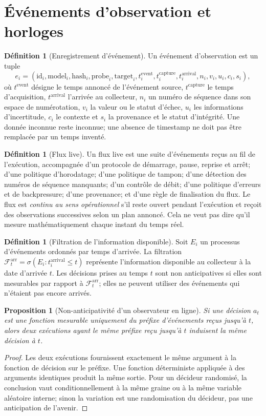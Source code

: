\documentclass[11pt,oneside]{book}
\newtheorem{proposition}[theoreme]{Proposition}
\theoremstyle{definition}
\newtheorem{definition}[theoreme]{Définition}
\theoremstyle{remark}
\newcommand{\Fcal}{\mathcal F}
\newcommand{\1}{\mathbf 1}
\begin{document}
\section{Événements d'observation et horloges}
\begin{definition}[Enregistrement d'événement]
Un événement d'observation est un tuple
\[
e_i=(\mathrm{id}_i,\mathrm{model}_i,\mathrm{hash}_i,\mathrm{probe}_i,\mathrm{target}_i,
 t_i^{\mathrm{event}},t_i^{\mathrm{capture}},t_i^{\mathrm{arrival}},n_i,v_i,u_i,c_i,s_i),
\]
où $t^{\mathrm{event}}$ désigne le temps annoncé de l'événement source, $t^{\mathrm{capture}}$ le temps d'acquisition, $t^{\mathrm{arrival}}$ l'arrivée au collecteur, $n_i$ un numéro de séquence dans son espace de numérotation, $v_i$ la valeur ou le statut d'échec, $u_i$ les informations d'incertitude, $c_i$ le contexte et $s_i$ la provenance et le statut d'intégrité. Une donnée inconnue reste inconnue; une absence de timestamp ne doit pas être remplacée par un temps inventé.
\end{definition}

\begin{definition}[Flux live]
Un flux live est une suite d'événements reçus au fil de l'exécution, accompagnée d'un protocole de démarrage, pause, reprise et arrêt; d'une politique d'horodatage; d'une politique de tampon; d'une détection des numéros de séquence manquants; d'un contrôle de débit; d'une politique d'erreurs et de backpressure; d'une provenance; et d'une règle de finalisation du flux. Le flux est \emph{continu au sens opérationnel} s'il reste ouvert pendant l'exécution et reçoit des observations successives selon un plan annoncé. Cela ne veut pas dire qu'il mesure mathématiquement chaque instant du temps réel.
\end{definition}

\begin{definition}[Filtration de l'information disponible]
Soit $E_i$ un processus d'événements ordonnés par temps d'arrivée. La filtration $\Fcal_t^{\mathrm{arr}}=\sigma(E_i:t_i^{\mathrm{arrival}}\leq t)$ représente l'information disponible au collecteur à la date d'arrivée $t$. Les décisions prises au temps $t$ sont non anticipatives si elles sont mesurables par rapport à $\Fcal_t^{\mathrm{arr}}$; elles ne peuvent utiliser des événements qui n'étaient pas encore arrivés.
\end{definition}

\begin{proposition}[Non-anticipativité d'un observateur en ligne]
Si une décision $a_t$ est une fonction mesurable uniquement du préfixe d'événements reçus jusqu'à $t$, alors deux exécutions ayant le même préfixe reçu jusqu'à $t$ induisent la même décision à $t$.
\end{proposition}
\begin{proof}
Les deux exécutions fournissent exactement le même argument à la fonction de décision sur le préfixe. Une fonction déterministe appliquée à des arguments identiques produit la même sortie. Pour un décideur randomisé, la conclusion vaut conditionnellement à la même graine ou à la même variable aléatoire interne; sinon la variation est une randomisation du décideur, pas une anticipation de l'avenir.
\end{proof}
\end{document}
